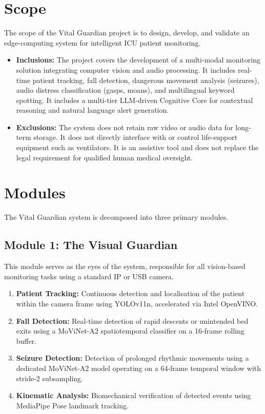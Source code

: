 \section{Scope}
\label{sec:scope}

The scope of the Vital Guardian project is to design, develop, and validate an
edge-computing system for intelligent ICU patient monitoring.

\begin{itemize}
    \item \textbf{Inclusions:} The project covers the development of a multi-modal
    monitoring solution integrating computer vision and audio processing. It includes
    real-time patient tracking, fall detection, dangerous movement analysis
    (seizures), audio distress classification (gasps, moans), and multilingual
    keyword spotting. It includes a multi-tier LLM-driven Cognitive Core for
    contextual reasoning and natural language alert generation.

    \item \textbf{Exclusions:} The system does not retain raw video or audio data
    for long-term storage. It does not directly interface with or control
    life-support equipment such as ventilators. It is an assistive tool and does
    not replace the legal requirement for qualified human medical oversight.
\end{itemize}

\section{Modules}
\label{sec:modules}

The Vital Guardian system is decomposed into three primary modules.

\subsection{Module 1: The Visual Guardian}

This module serves as the eyes of the system, responsible for all vision-based
monitoring tasks using a standard IP or USB camera.

\begin{enumerate}
    \item \textbf{Patient Tracking:} Continuous detection and localisation of the
    patient within the camera frame using YOLOv11n, accelerated via Intel OpenVINO.
    \item \textbf{Fall Detection:} Real-time detection of rapid descents or
    unintended bed exits using a MoViNet-A2 spatiotemporal classifier on a
    16-frame rolling buffer.
    \item \textbf{Seizure Detection:} Detection of prolonged rhythmic movements
    using a dedicated MoViNet-A2 model operating on a 64-frame temporal window
    with stride-2 subsampling.
    \item \textbf{Kinematic Analysis:} Biomechanical verification of detected
    events using MediaPipe Pose landmark tracking.
\end{enumerate}

